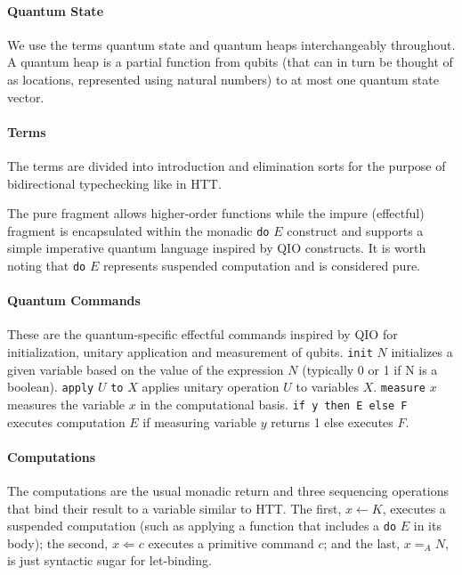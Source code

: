 \documentclass[acmsmall,nonacm,timestamp,review=false,anonymous=false]{acmart}
\newcommand{\kw}[1]{\,\mathrm{\texttt{#1}}\,}
\begin{document}
\paragraph{Quantum State}

We use the terms quantum state and quantum heaps interchangeably throughout. A quantum heap is a partial function from qubits (that can in turn be thought of as locations, represented using natural numbers) to at most one quantum state vector.


\paragraph{Terms}
The terms are divided into introduction and elimination sorts for the purpose of bidirectional typechecking like in HTT.

The pure fragment allows higher-order functions while the impure (effectful) fragment is encapsulated within the monadic \texttt{do} $E$ construct and supports a simple imperative quantum language inspired by QIO constructs. It is worth noting that \texttt{do} $E$ represents suspended computation and is considered pure.

\paragraph{Quantum Commands}
These are the quantum-specific effectful commands inspired by QIO for initialization, unitary application and measurement of qubits.
\texttt{init} $N$ initializes a given variable based on the value of the expression $N$ (typically 0 or 1 if N is a boolean).
\texttt{apply} $U$ \texttt{to} $X$ applies unitary operation $U$ to variables $X$.
\texttt{measure} $x$ measures the variable $x$ in the computational basis.
\texttt{if y then E else F} executes computation $E$ if measuring variable $y$ returns 1 else executes $F$.

\paragraph{Computations} The computations are the usual monadic return and three sequencing operations that bind their result to a variable similar to HTT. The first, $x \leftarrow K$, executes a suspended computation (such as applying a function that includes a \texttt{do} $E$ in its body); the second, $x \Leftarrow c$ executes a primitive command $c$; and the last, $x =_A N$, is just syntactic sugar for let-binding.
\end{document}
